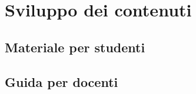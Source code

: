 \documentclass[../../relazione.tex]{subfiles}
\begin{document}
\section{Sviluppo dei contenuti}

\subsection{Materiale per studenti}

\subsection{Guida per docenti}
\end{document}
